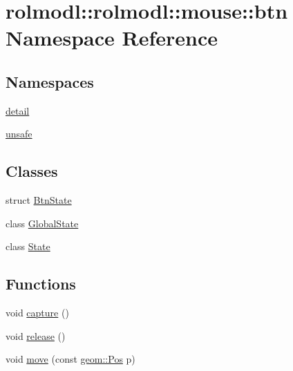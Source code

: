 \hypertarget{namespacerolmodl_1_1rolmodl_1_1mouse_1_1btn}{}\section{rolmodl\+::rolmodl\+::mouse\+::btn Namespace Reference}
\label{namespacerolmodl_1_1rolmodl_1_1mouse_1_1btn}
\subsection*{Namespaces}
\begin{DoxyCompactItemize}
\item 
 \mbox{\hyperlink{namespacerolmodl_1_1rolmodl_1_1mouse_1_1btn_1_1detail}{detail}}
\item 
 \mbox{\hyperlink{namespacerolmodl_1_1rolmodl_1_1mouse_1_1btn_1_1unsafe}{unsafe}}
\end{DoxyCompactItemize}
\subsection*{Classes}
\begin{DoxyCompactItemize}
\item 
struct \mbox{\hyperlink{structrolmodl_1_1rolmodl_1_1mouse_1_1btn_1_1_btn_state}{Btn\+State}}
\item 
class \mbox{\hyperlink{classrolmodl_1_1rolmodl_1_1mouse_1_1btn_1_1_global_state}{Global\+State}}
\item 
class \mbox{\hyperlink{classrolmodl_1_1rolmodl_1_1mouse_1_1btn_1_1_state}{State}}
\end{DoxyCompactItemize}
\subsection*{Functions}
\begin{DoxyCompactItemize}
\item 
void \mbox{\hyperlink{namespacerolmodl_1_1rolmodl_1_1mouse_1_1btn_a410d296f8902c2db116ce423ecdc5fc1}{capture}} ()
\item 
void \mbox{\hyperlink{namespacerolmodl_1_1rolmodl_1_1mouse_1_1btn_a4fd3788e86fc36f3ced6e6600ac206ed}{release}} ()
\item 
void \mbox{\hyperlink{namespacerolmodl_1_1rolmodl_1_1mouse_1_1btn_a8aa0a0f0370d83af512990d3792306ee}{move}} (const \mbox{\hyperlink{structrolmodl_1_1geom_1_1_pos}{geom\+::\+Pos}} p)
\end{DoxyCompactItemize}



